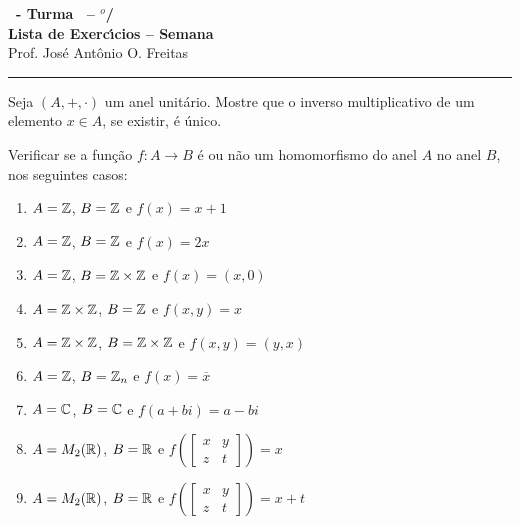 \documentclass[12pt]{exam}
\begin{document}
    \begin{center}
    {\Large\bf \disciplina\ - Turma \turma\ -- \semestre$^{o}$/\ano} \\ \vspace{9pt} {\large\bf
        Lista de Exerc{\'\i}cios -- Semana \numerosemana}\\ \vspace{9pt} Prof. Jos{\'e} Ant{\^o}nio O. Freitas
    \end{center}
    \hrule

    \vspace{.6cm}

    \questao{}  Seja $(A, +, \cdot)$ um anel unit\'ario. Mostre que o inverso multiplicativo de um elemento $x \in A$, se existir, \'e \'unico.

    \vspace{.3cm}

     Verificar se a fun\c{c}\~ao $f : A \to B$ \'e ou n\~ao um homomorfismo do anel $A$ no anel $B$, nos seguintes casos:
    \begin{enumerate}[label=({\alph*})]
        \item $A = \mathbb{Z}$, $B = \mathbb{Z}$ e $f(x) = x + 1$

        \item $A = \mathbb{Z}$, $B = \mathbb{Z}$ e $f(x) = 2x$

        \item $A = \mathbb{Z}$, $B = \mathbb{Z} \times \mathbb{Z}$ e $f(x) = (x, 0)$

        \item $A = \mathbb{Z} \times \mathbb{Z}$, $B = \mathbb{Z}$ e $f(x,y) = x$

        \item $A = \mathbb{Z} \times \mathbb{Z}$, $B = \mathbb{Z} \times \mathbb{Z}$ e $f(x,y) = (y,x)$

        \item $A = \mathbb{Z}$, $B = \mathbb{Z}_n$ e $f(x) = \overline{x}$

        \item $A = \mathbb{C}$, $B = \mathbb{C}$ e $f(a + bi) = a - bi$

        \item $A = M_2(\mathbb{R})$, $B = \mathbb{R}$ e $f\left(\begin{bmatrix}
            x & y\\z & t
        \end{bmatrix}\right) = x$

        \item $A = M_2(\mathbb{R})$, $B = \mathbb{R}$ e $f\left(\begin{bmatrix}
            x & y\\z & t
        \end{bmatrix}\right) = x + t$
    \end{enumerate}
\end{document}
